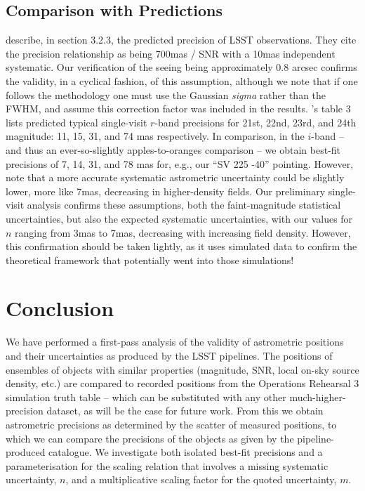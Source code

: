 \documentclass[SE,authoryear,toc]{lsstdoc}
\begin{document}
\subsection{Comparison with \citet{Ivezic2019} Predictions}
\citet{Ivezic2019} describe, in section 3.2.3, the predicted precision of LSST observations.
They cite the precision relationship as being 700mas / SNR with a 10mas independent systematic.
Our verification of the seeing being approximately 0.8 arcsec confirms the validity, in a cyclical fashion, of this assumption, although we note that if one follows the \citet{King:1983aa} methodology one must use the Gaussian \textit{sigma} rather than the FWHM, and assume this correction factor was included in the \citeauthor{Ivezic2019} results.
\citeauthor{Ivezic2019}'s table 3 lists predicted typical single-visit $r$-band precisions for 21st, 22nd, 23rd, and 24th magnitude: 11, 15, 31, and 74 mas respectively.
In comparison, in the $i$-band -- and thus an ever-so-slightly apples-to-oranges comparison -- we obtain best-fit precisions of 7, 14, 31, and 78 mas for, e.g., our ``SV 225 -40'' pointing.
However, \citet{Ivezic2019} note that a more accurate systematic astrometric uncertainty could be slightly lower, more like 7mas, decreasing in higher-density fields.
Our preliminary single-visit analysis confirms these assumptions, both the faint-magnitude statistical uncertainties, but also the expected systematic uncertainties, with our values for $n$ ranging from 3mas to 7mas, decreasing with increasing field density.
However, this confirmation should be taken lightly, as it uses simulated data to confirm the theoretical framework that potentially went into those simulations!

\section{Conclusion}
We have performed a first-pass analysis of the validity of astrometric positions and their uncertainties as produced by the LSST pipelines.
The positions of ensembles of objects with similar properties (magnitude, SNR, local on-sky source density, etc.) are compared to recorded positions from the Operations Rehearsal 3 simulation truth table -- which can be substituted with any other much-higher-precision dataset, as will be the case for future work.
From this we obtain astrometric precisions as determined by the scatter of measured positions, to which we can compare the precisions of the objects as given by the pipeline-produced catalogue.
We investigate both isolated best-fit precisions and a parameterisation for the scaling relation that involves a missing systematic uncertainty, $n$, and a multiplicative scaling factor for the quoted uncertainty, $m$.
\end{document}
